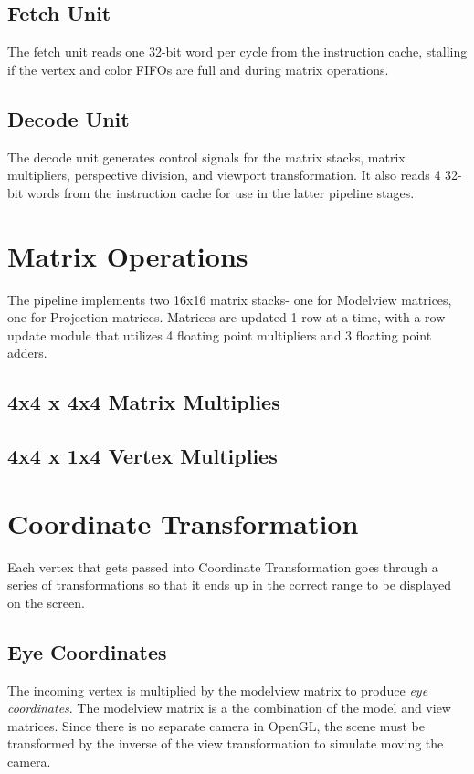 \documentclass[letterpaper,10pt]{article}
\begin{document}
\subsection{Fetch Unit}
The fetch unit reads one 32-bit word per cycle from the instruction cache, stalling if the vertex and color FIFOs are full and during matrix operations.

\subsection{Decode Unit}
The decode unit generates control signals for the matrix stacks, matrix multipliers, perspective division, and viewport transformation. It also reads 4 32-bit words from the instruction cache for use in the latter pipeline stages.

\section{Matrix Operations}
The pipeline implements two 16x16 matrix stacks- one for Modelview matrices, one for Projection matrices. Matrices are updated 1 row at a time, with a row update module that utilizes 4 floating point multipliers and 3 floating point adders.
\subsection{4x4 x 4x4 Matrix Multiplies}
\subsection{4x4 x 1x4 Vertex Multiplies}

\section{Coordinate Transformation}
Each vertex that gets passed into Coordinate Transformation goes through a series of transformations so that it ends up in the correct range to be displayed on the screen.

\subsection{Eye Coordinates}
The incoming vertex is multiplied by the modelview matrix to produce \emph{eye coordinates}. The modelview matrix is a the combination of the model and view matrices. Since there is no separate camera in OpenGL, the scene must be transformed by the inverse of the view transformation to simulate moving the camera.\\
\end{document}
